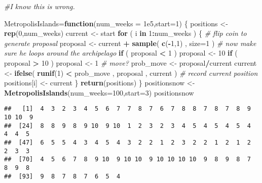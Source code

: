 \documentclass[]{article}
\newenvironment{Shaded}{\begin{snugshade}}{\end{snugshade}}
\newcommand{\KeywordTok}[1]{\textcolor[rgb]{0.13,0.29,0.53}{\textbf{#1}}}
\newcommand{\DataTypeTok}[1]{\textcolor[rgb]{0.13,0.29,0.53}{#1}}
\newcommand{\DecValTok}[1]{\textcolor[rgb]{0.00,0.00,0.81}{#1}}
\newcommand{\FloatTok}[1]{\textcolor[rgb]{0.00,0.00,0.81}{#1}}
\newcommand{\StringTok}[1]{\textcolor[rgb]{0.31,0.60,0.02}{#1}}
\newcommand{\CommentTok}[1]{\textcolor[rgb]{0.56,0.35,0.01}{\textit{#1}}}
\newcommand{\ControlFlowTok}[1]{\textcolor[rgb]{0.13,0.29,0.53}{\textbf{#1}}}
\newcommand{\OperatorTok}[1]{\textcolor[rgb]{0.81,0.36,0.00}{\textbf{#1}}}
\newcommand{\NormalTok}[1]{#1}
\begin{document}
\begin{Shaded}
\begin{Highlighting}[]
\CommentTok{#I know this is wrong.}

\NormalTok{MetropolisIslands=}\ControlFlowTok{function}\NormalTok{(}\DataTypeTok{num_weeks =} \FloatTok{1e5}\NormalTok{,}\DataTypeTok{start=}\DecValTok{1}\NormalTok{)}
\NormalTok{\{}
\NormalTok{positions <-}\StringTok{ }\KeywordTok{rep}\NormalTok{(}\DecValTok{0}\NormalTok{,num_weeks)}
\NormalTok{current <-}\StringTok{ }\NormalTok{start}
\ControlFlowTok{for}\NormalTok{ ( i }\ControlFlowTok{in} \DecValTok{1}\OperatorTok{:}\NormalTok{num_weeks ) \{}
  \CommentTok{# flip coin to generate proposal}
\NormalTok{  proposal <-}\StringTok{ }\NormalTok{current }\OperatorTok{+}\StringTok{ }\KeywordTok{sample}\NormalTok{( }\KeywordTok{c}\NormalTok{(}\OperatorTok{-}\DecValTok{1}\NormalTok{,}\DecValTok{1}\NormalTok{) , }\DataTypeTok{size=}\DecValTok{1}\NormalTok{ )}
  \CommentTok{# now make sure he loops around the archipelago}
  \ControlFlowTok{if}\NormalTok{ ( proposal }\OperatorTok{<}\StringTok{ }\DecValTok{1}\NormalTok{ )  proposal <-}\StringTok{ }\DecValTok{10}
  \ControlFlowTok{if}\NormalTok{ ( proposal }\OperatorTok{>}\StringTok{ }\DecValTok{10}\NormalTok{ ) proposal <-}\StringTok{ }\DecValTok{1}
  \CommentTok{# move?}
\NormalTok{  prob_move <-}\StringTok{ }\NormalTok{proposal}\OperatorTok{/}\NormalTok{current}
\NormalTok{  current <-}\StringTok{ }\KeywordTok{ifelse}\NormalTok{( }\KeywordTok{runif}\NormalTok{(}\DecValTok{1}\NormalTok{) }\OperatorTok{<}\StringTok{ }\NormalTok{prob_move , proposal , current )}
  \CommentTok{# record current position}
\NormalTok{  positions[i] <-}\StringTok{ }\NormalTok{current}
\NormalTok{\}}
\KeywordTok{return}\NormalTok{(positions)}
\NormalTok{\}}
\NormalTok{positionsnow <-}\StringTok{ }\KeywordTok{MetropolisIslands}\NormalTok{(}\DataTypeTok{num_weeks=}\DecValTok{100}\NormalTok{,}\DataTypeTok{start=}\DecValTok{3}\NormalTok{)}
\NormalTok{positionsnow}
\end{Highlighting}
\end{Shaded}

\begin{verbatim}
##   [1]  4  3  2  3  4  5  6  7  7  8  7  6  7  8  8  7  8  7  8  9 10 10  9
##  [24]  8  8  9  8  9 10  9 10  1  2  3  2  3  4  5  4  5  4  5  4  4  4  5
##  [47]  6  5  5  4  3  4  5  4  3  2  2  1  2  3  2  2  1  2  1  2  2  3  3
##  [70]  4  5  6  7  8  9 10  9 10 10  9 10 10 10 10  9  8  9  8  7  8  9  8
##  [93]  9  8  7  8  7  6  5  4
\end{verbatim}
\end{document}
